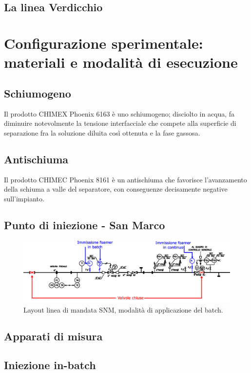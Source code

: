 \subsection{La linea Verdicchio}

\section{Configurazione sperimentale: materiali e modalità di esecuzione}
\subsection{Schiumogeno}
Il prodotto CHIMEX Phoenix 6163 è uno schiumogeno; disciolto in acqua, fa diminuire notevolmente la tensione interfacciale che compete alla superficie di separazione fra la soluzione diluita così ottenuta e la fase gassosa.
\subsection{Antischiuma}
Il prodotto CHIMEC Phoenix 8161 è un antischiuma che favorisce l'avanzamento della schiuma a valle del separatore, con conseguenze decisamente negative sull'impianto.

\subsection{Punto di iniezione - San Marco}

\begin{figure}[!htbp] %
    \centering
    \includegraphics[width=\textwidth]{fig/test/mandata.eps}
    \caption{Layout linea di mandata SNM, modalità di applicazione del batch.} 
    \label{fig:mandata}
\end{figure}

\subsection{Apparati di misura}
\subsection{Iniezione in-batch}
